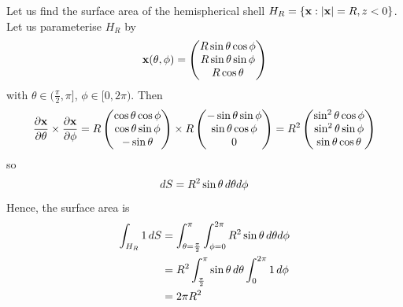 \documentclass{../template/note}
\begin{document}
    \begin{example*}
        Let us find the surface area of the hemispherical shell \(H_R = \{\V x: |\V x| = R, z < 0\}\). Let us parameterise \(H_R\) by
        \begin{align*}
            \V x(\theta, \phi) = \begin{pmatrix}
             R \sin \theta \cos \phi \\
             R \sin \theta \sin \phi \\
             R \cos \theta \\
            \end{pmatrix}
        \end{align*}
        with \(\theta \in (\frac{\pi}2, \pi]\), \(\phi \in [0, 2\pi)\). Then
        \begin{align*}
            \pd{\V x}\theta \times \pd{\V x}\phi = R \begin{pmatrix}
             \cos \theta \cos \phi \\
             \cos \theta \sin \phi \\
             -\sin \theta \\
            \end{pmatrix} \times R \begin{pmatrix}
             -\sin \theta \sin \phi \\
             \sin \theta \cos \phi \\
             0 \\
            \end{pmatrix} = R^2 \begin{pmatrix}
             \sin^2 \theta \cos \phi \\
             \sin^2 \theta \sin \phi \\
             \sin \theta \cos \theta \\
            \end{pmatrix}
        \end{align*}
        so
        \begin{align*}
            dS = R^2 \sin \theta \,d{\theta} d\phi
        \end{align*}
        Hence, the surface area is
        \begin{align*}
            \int_{H_R} 1 \,d{S} &= \int_{\theta = \frac{\pi}{2}}^\pi \int_{\phi=0}^{2 \pi} R^2 \sin \theta \,d{\theta} d \phi \\
            &= R^2 \int_{\frac{\pi}{2}}^\pi \sin \theta \,d{\theta} \int_0^{2\pi} 1 \,d{\phi} \\
            &= 2\pi R^2
        \end{align*}
    \end{example*}
    
\end{document}
